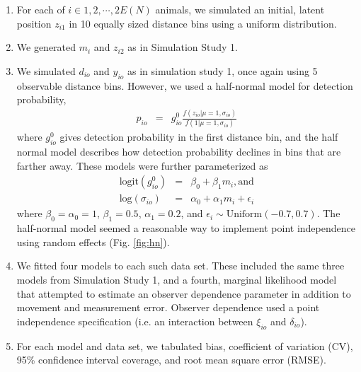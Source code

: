 \documentclass[12pt,fleqn]{article}
\begin{document}
\begin{enumerate}
  \item For each of $i \in 1,2,\cdots,2E(N)$ animals, we simulated an initial, latent position $z_{i1}$ in 10 equally sized distance bins using a uniform distribution.
  \item We generated $m_i$ and $z_{i2}$ as in Simulation Study 1.
  \item We simulated $d_{io}$ and $y_{io}$ as in simulation study 1, once again using 5 observable distance bins. However, we used a half-normal model for detection probability,
      \begin{eqnarray*}
        p_{io} & = & g_{io}^0 \frac{f(z_{io}|\mu=1,\sigma_{io})}{f(1|\mu=1,\sigma_{io})}
      \end{eqnarray*}
      where $g_{io}^0$ gives detection probability in the first distance bin, and the half normal model describes how detection probability declines in bins that are farther away. These models were further parameterized as
      \begin{eqnarray*}
        \text{logit}(g_{io}^0) & = & \beta_0 + \beta_1 m_i, \text{and} \\
        \text{log}(\sigma_{io}) & = & \alpha_0 + \alpha_1 m_i + \epsilon_i
      \end{eqnarray*}
      where $\beta_0 = \alpha_0 = 1$, $\beta_1 = 0.5$, $\alpha_1 = 0.2$, and $\epsilon_i \sim \text{Uniform}(-0.7,0.7)$.  The half-normal model seemed a reasonable way to implement point independence \citep{LaakeBorchers2004} using random effects (Fig. \ref{fig:hn}).
  \item We fitted four models to each such data set.  These included the same three models from Simulation Study 1, and a fourth, marginal likelihood model that attempted to estimate an observer dependence parameter in addition to movement and measurement error.  Observer dependence used a point independence specification (i.e. an interaction between $\xi_{io}$ and $\delta_{io}$). \\
  \item For each model and data set, we tabulated bias, coefficient of variation (CV), 95\% confidence interval coverage, and root mean square error (RMSE).
\end{enumerate}
\end{document}
